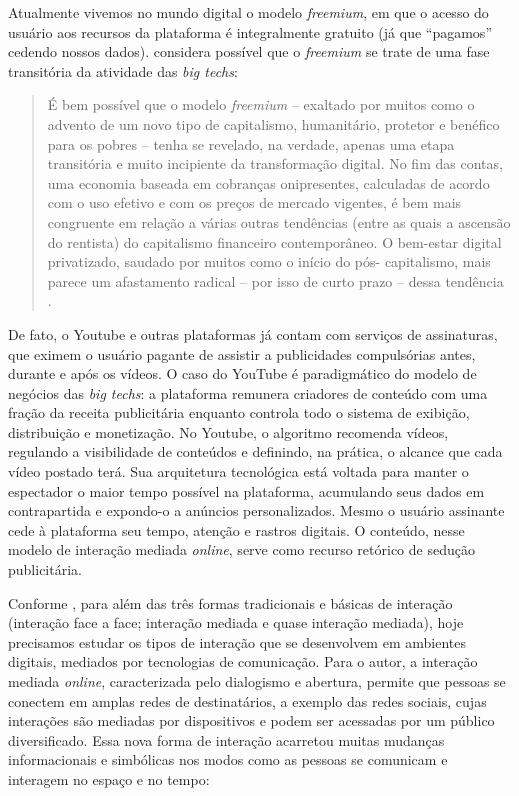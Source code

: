 \documentclass[portuguese]{textolivre}
\begin{document}
Atualmente vivemos no mundo digital o modelo \textit{freemium}, em que o acesso do usuário aos recursos da plataforma é integralmente gratuito (já que “pagamos” cedendo nossos dados). \textcite{Morozov2018BigTech} considera possível que o \textit{freemium} se trate de uma fase transitória da atividade das \textit{big techs}:

\begin{quote}
    É bem possível que o modelo \textit{freemium} – exaltado por muitos como o advento de um novo tipo de capitalismo, humanitário, protetor e benéfico para os pobres – tenha se revelado, na verdade, apenas uma etapa transitória e muito incipiente da transformação digital. No fim das contas, uma economia baseada em cobranças onipresentes, calculadas de acordo com o uso efetivo e com os preços de mercado vigentes, é bem mais congruente em relação a várias outras tendências (entre as quais a ascensão do rentista) do capitalismo financeiro contemporâneo. O bem-estar digital privatizado, saudado por muitos como o início do pós- capitalismo, mais parece um afastamento radical – por isso de curto prazo – dessa tendência \cite[p. 154]{Morozov2018BigTech}.
\end{quote}

De fato, o Youtube e outras plataformas já contam com serviços de assinaturas, que eximem o usuário pagante de assistir a publicidades compulsórias antes, durante e após os vídeos. O caso do YouTube é paradigmático do modelo de negócios das \textit{big techs}: a plataforma remunera criadores de conteúdo com uma fração da receita publicitária enquanto controla todo o sistema de exibição, distribuição e monetização. No Youtube, o algoritmo recomenda vídeos, regulando a visibilidade de conteúdos e definindo, na prática, o alcance que cada vídeo postado terá. Sua arquitetura tecnológica está voltada para manter o espectador o maior tempo possível na plataforma, acumulando seus dados em contrapartida e expondo-o a anúncios personalizados. Mesmo o usuário assinante cede à plataforma seu tempo, atenção e rastros digitais. O conteúdo, nesse modelo de interação mediada \textit{online}, serve como recurso retórico de sedução publicitária.

Conforme \textcite{Thompson2018InteracaoMediada}, para além das três formas tradicionais e básicas de interação (interação face a face; interação mediada e quase interação mediada), hoje precisamos estudar os tipos de interação que se desenvolvem em ambientes digitais, mediados por tecnologias de comunicação. Para o autor, a interação mediada \textit{online}, caracterizada pelo dialogismo e abertura, permite que pessoas se conectem em amplas redes de destinatários, a exemplo das redes sociais, cujas interações são mediadas por dispositivos e podem ser acessadas por um público diversificado. Essa nova forma de interação acarretou muitas mudanças informacionais e simbólicas nos modos como as pessoas se comunicam e interagem no espaço e no tempo:
\end{document}
